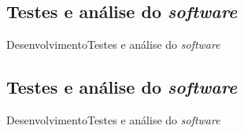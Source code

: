 \subsection{Testes e análise do \textit{software}}
\begin{frame}{Desenvolvimento}{Testes e análise do \textit{software}}

\end{frame}

\subsection{Testes e análise do \textit{software}}
\begin{frame}{Desenvolvimento}{Testes e análise do \textit{software}}

\end{frame}